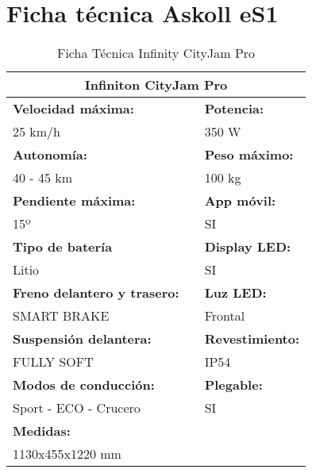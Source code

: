 \newpage
\section{Ficha técnica Askoll eS1}
\label{anexo:ficha tecnica infinity cityjam}

\begin{table}[H]
\centering
\begin{tabular}{lll}
\multicolumn{3}{c}{\textbf{Infiniton CityJam Pro}}                        \\ \hline
\textbf{Velocidad máxima:}          &           & \textbf{Potencia:}      \\
25 km/h                             &           & 350 W                   \\
\textbf{Autonomía:}                 &           & \textbf{Peso máximo:}   \\
40 - 45 km                          &           & 100 kg                  \\
\textbf{Pendiente máxima:}          &           & \textbf{App móvil:}     \\
15º                                 & \textbf{} & SI                      \\
\textbf{Tipo de batería}            &           & \textbf{Display LED:}   \\
Litio                               &           & SI                      \\
\textbf{Freno delantero y trasero:} &           & \textbf{Luz LED:}       \\
SMART BRAKE                         &           & Frontal                 \\
\textbf{Suspensión delantera:}      &           & \textbf{Revestimiento:} \\
FULLY SOFT                          &           & IP54                    \\
\textbf{Modos de conducción:}       &           & \textbf{Plegable:}      \\
Sport - ECO - Crucero               &           & SI                      \\
\textbf{Medidas:}                   &           &                         \\
1130x455x1220 mm                    &           &                        
\end{tabular}
\caption{Ficha Técnica Infinity CityJam Pro}
\label{tab: ficha tecnica infinity cityjam}

\end{table}